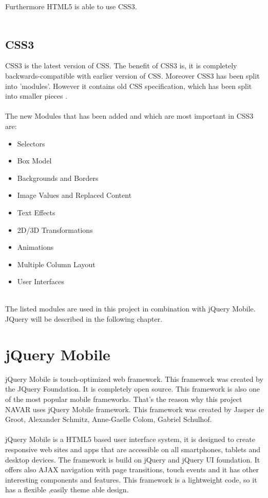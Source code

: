   Furthermore HTML5 is able to use CSS3.\cite{html5}
  \\\\
  \subsection{CSS3}
  CSS3 is the latest version of CSS. The benefit of CSS3 is, it is completely backwards-compatible with earlier version of CSS. Moreover CSS3 has been split into 'modules'. However it contains old CSS specification, which has been split into smaller pieces .
  \\\\
  The new Modules that has been added and which are most important in CSS3 are:\\
  \begin{itemize}
  \item	Selectors
  \item	Box Model
  \item Backgrounds and Borders
  \item	Image Values and Replaced Content
  \item	Text Effects
  \item	2D/3D Transformations
  \item	Animations 
  \item 	Multiple Column Layout
  \item User Interfaces
  
  \end{itemize}
  \cite{CSS3}
  \\
  The listed modules are used in this project in combination with jQuery Mobile. JQuery will be described in the following chapter.
  \section{jQuery Mobile}
  jQuery Mobile is touch-optimized web framework. This framework was created by the JQuery Foundation. It is completely open source. This framework is also one of the most popular mobile frameworks. That's the  reason why this project NAVAR uses jQuery Mobile framework. This framework was created by Jasper de Groot, Alexander Schmitz, Anne-Gaelle Colom, Gabriel Schulhof.\\\\
  
  jQuery Mobile is a HTML5 based user interface system, it is designed to create responsive web sites and apps that are accessible on all smartphones, tablets and desktop devices. The framework is build on jQuery and jQuery UI foundation. It offers also AJAX navigation with page transitions, touch events and it has other interesting components and features. This framework is a lightweight code, so it has a flexible ,easily theme able design. \\\\
  
